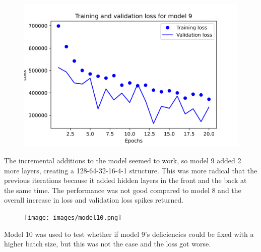 \documentclass{article}
\begin{document}
    \begin{figure}[H]
        \includegraphics[width=\linewidth]{images/model9.png}
    \end{figure}
    The incremental additions to the model seemed to work, so model 9 added 2 more layers, creating a 128-64-32-16-4-1 structure. 
    This was more radical that the previous iterations because it added hidden layers in the front and the back at the same time. 
    The performance was not good compared to model 8 and the overall increase in loss and validation loss spikes returned.

    \begin{figure}[H]
        \texttt{[image: images/model10.png]}
    \end{figure}
    Model 10 was used to test whether if model 9's deficiencies could be fixed with a higher batch size, but this was not the case 
    and the loss got worse. 
\end{document}
